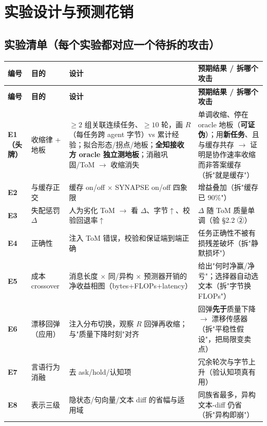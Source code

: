 \documentclass[UTF8,fontset=windows,11pt]{ctexart}
\begin{document}
\section{实验设计与预测花销}

\subsection{实验清单（每个实验都对应一个待拆的攻击）}
{\footnotesize
\renewcommand{\arraystretch}{1.22}
\begin{longtable}{@{}p{1.6cm}p{2.6cm}p{5.2cm}p{5.6cm}@{}}
\toprule
\textbf{编号} & \textbf{目的} & \textbf{设计} & \textbf{预期结果 / 拆哪个攻击} \\
\midrule
\endfirsthead
\toprule
\textbf{编号} & \textbf{目的} & \textbf{设计} & \textbf{预期结果 / 拆哪个攻击} \\
\midrule
\endhead
\textbf{E1（头牌）} & 收缩律 + 地板 & $\ge2$ 组关联连续任务、$\ge10$ 轮，画 $R$（每任务跨 agent 字节）vs 累计经验；拟合形态/拐点/地板；\textbf{全知接收方 oracle 独立测地板}；消融巩固/ToM $\to$ 收缩消失 & 单调收缩、停在 oracle 地板（\textbf{可证伪}）；用\textbf{新任务}、且与缓存共存 $\to$ 证明是协作速率收缩而非答案缓存（拆"就是缓存"） \\
\textbf{E2} & 与缓存正交 & 缓存 on/off $\times$ SYNAPSE on/off 四象限 & 增益叠加（拆"缓存已 90\%"） \\
\textbf{E3} & 失配惩罚 $\Delta$ & 人为劣化 ToM $\to$ 看 $\Delta$、字节$\uparrow$、校验回退率$\uparrow$ & $\Delta$ 随 ToM 质量单调（验 §2.2 ②） \\
\textbf{E4} & 正确性 & 注入 ToM 错误，校验和保证端到端正确 & 任务正确性不被有损残差破坏（拆"静默损坏"） \\
\textbf{E5} & 成本 crossover & 消息长度 $\times$ 同/异构 $\times$ 预测器开销的净收益相图（bytes+FLOPs+latency） & 给出"何时净赢/净亏"；选择器自动选文本（拆"字节换 FLOPs"） \\
\textbf{E6} & 漂移回弹（应用） & 注入分布切换，观察 $R$ 回弹再收缩；与"质量下降时刻"对齐 & 回弹\textbf{先于}质量下降 $\to$ 漂移传感器（拆"平稳性假设"，把局限变卖点） \\
\textbf{E7} & 言语行为消融 & 去 ask/hold/认知项 & 冗余轮次与字节上升（验认知项真有用） \\
\textbf{E8} & 表示三级 & 隐状态/句向量/文本 diff 的省幅与适用域 & 同族省最多，异构文本-diff 仍省（拆"异构即崩"） \\
\bottomrule
\end{longtable}}
\end{document}
